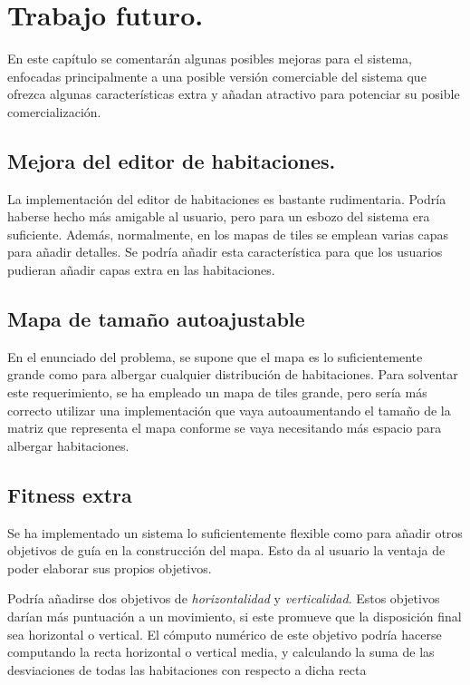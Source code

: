 \chapter{Trabajo futuro.}\label{cap:capitulo8}

En este capítulo se comentarán algunas posibles mejoras para el sistema, enfocadas principalmente a una posible versión comerciable del sistema que ofrezca algunas características extra y añadan atractivo para potenciar su posible comercialización.




\section{Mejora del editor de habitaciones.}

La implementación del editor de habitaciones es bastante rudimentaria. Podría haberse hecho más amigable al usuario, pero para un esbozo del sistema era suficiente. Además, normalmente, en los mapas de tiles se emplean varias capas para añadir detalles. Se podría añadir esta característica para que los usuarios pudieran añadir capas extra en las habitaciones.

\section{Mapa de tamaño autoajustable}

En el enunciado del problema, se supone que el mapa es lo suficientemente grande como para albergar cualquier distribución de habitaciones. Para solventar este requerimiento, se ha empleado un mapa de tiles grande, pero sería más correcto utilizar una implementación que vaya autoaumentando el tamaño de la matriz que representa el mapa conforme se vaya necesitando más espacio para albergar habitaciones.

\section{Fitness extra}

Se ha implementado un sistema lo suficientemente flexible como para añadir otros objetivos de guía en la construcción del mapa. Esto da al usuario la ventaja de poder elaborar sus propios objetivos.

Podría añadirse dos objetivos de \emph{horizontalidad} y \emph{verticalidad}. Estos objetivos darían más puntuación a un movimiento, si este promueve que la disposición final sea horizontal o vertical. El cómputo numérico de este objetivo podría hacerse computando la recta horizontal o vertical media, y calculando la suma de las desviaciones de todas las habitaciones con respecto a dicha recta

